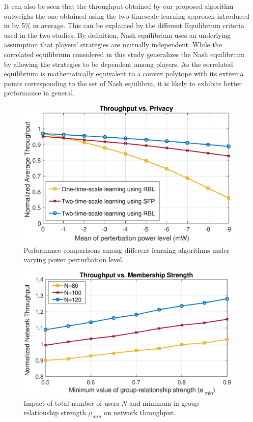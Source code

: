 It can also be seen that the throughput obtained by our proposed algorithm outweighs the one obtained using the two-timescale learning approach introduced in \cite{ZhangGlobe} by 5\% in average. This can be explained by the different  Equilibrium criteria used in the two studies. By definition, Nash equilibrium uses an underlying assumption that players' strategies are mutually independent. While the correlated equilibrium considered in this study generalizes the Nash equilibrium by allowing the strategies to be dependent among players. As the correlated equilibrium is mathematically equivalent to a convex polytope with its extrema points corresponding to the set of Nash equilibria, it is likely to exhibits better performance in general. 
\begin{figure}[htb]
\centering
\includegraphics[scale=0.37]{./pic/thp_pert_new3.eps}
\caption{Performance comparisons among different learning algorithms under varying power perturbation level.}\label{fg:Fig33}
\end{figure}
\begin{figure}[htb]
\centering
\includegraphics[scale=0.37]{./pic/thp_soc_new3.eps}
\caption{Impact of total number of users $N$ and minimum in-group relationship strength $\mu_{min}$ on network throughput.}\label{fg:Fig22}
\end{figure}
